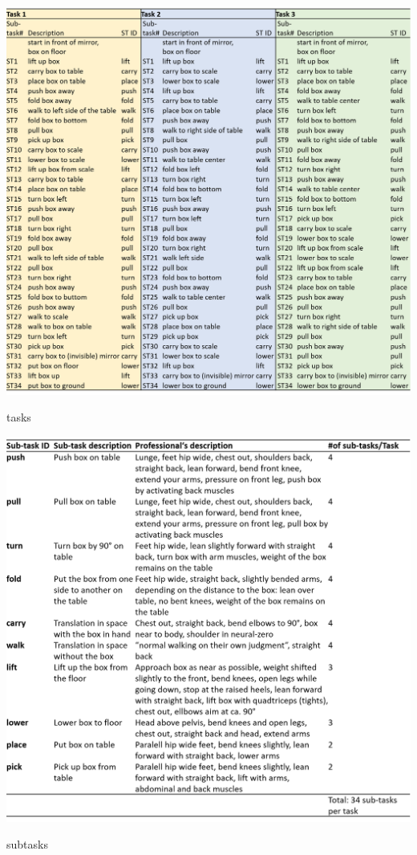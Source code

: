 \begin{table}[htb]
	\centering
	\includegraphics[width=\textwidth]{figures/tasks.png}
	\caption[Description of tasks]{tasks}
	\label{tab:tasks}
\end{table}

\begin{table}[htb]
	\centering
	\includegraphics[width=\textwidth]{figures/sub_tasks_definition.png}
	\caption[Description of sub-tasks]{subtasks}
	\label{tab:sub-tasks}
\end{table}

